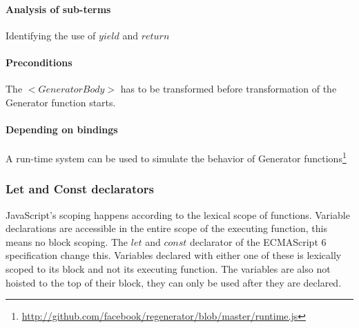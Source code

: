 \documentclass[10pt,a4paper]{article}
\begin{document}
\paragraph{Analysis of sub-terms}
Identifying the use of $yield$ and $return$

\paragraph{Preconditions}
The $<GeneratorBody>$ has to be transformed before transformation of the Generator function starts.

\paragraph{Depending on bindings}
A run-time system can be used to simulate the behavior of Generator functions\footnote{\url{http://github.com/facebook/regenerator/blob/master/runtime.js}}

\subsubsection{Let and Const declarators}
JavaScript's scoping happens according to the lexical scope of functions. Variable declarations are accessible in the entire scope of the executing function, this means no block scoping. The $let$ and $const$ declarator of the ECMAScript 6 specification change this. Variables declared with either one of these is lexically scoped to its block and not its executing function. The variables are also not hoisted to the top of their block, they can only be used after they are declared.
\end{document}

